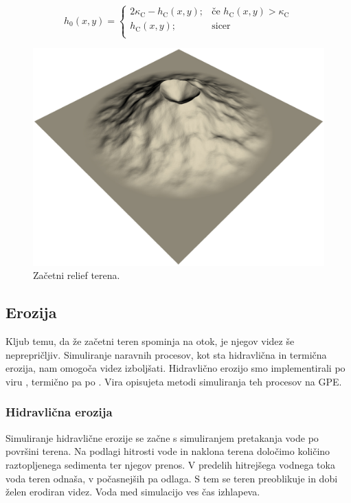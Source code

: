\documentclass[9pt]{pnas-new}
\newcommand{\const}[1]{{\ensuremath{\kappa_\mathrm{#1}}}}
\begin{document}
\begin{equation} \label{eq:crater}
h_0(x,y) = 
\begin{cases}
2\const{C} - h_\mathrm{C}(x,y); & \text{če } h_\mathrm{C}(x,y) > \const{C}\\
h_\mathrm{C}(x,y); & \text{sicer}\\
\end{cases}
\end{equation}

\begin{figure}
	\centering
	\includegraphics[width=.8\linewidth]{example_merged_crater_screen}
	\caption{Začetni relief terena.}
	\label{fig:merged_crater_example}
\end{figure}

\subsection*{Erozija}
Kljub temu, da že začetni teren spominja na otok, je njegov videz še neprepričljiv. Simuliranje naravnih procesov, kot sta hidravlična in termična erozija, nam omogoča videz izboljšati. Hidravlično erozijo smo implementirali po viru \cite{benevs_fast_gpu_07}, termično pa po \cite{jako_fast_gpu_11}. Vira opisujeta metodi simuliranja teh procesov na GPE.

\subsubsection*{Hidravlična erozija}
Simuliranje hidravlične erozije se začne s simuliranjem pretakanja vode po površini terena. Na podlagi hitrosti vode in naklona terena določimo količino raztopljenega sedimenta ter njegov prenos. V predelih hitrejšega vodnega toka voda teren odnaša, v počasnejših pa odlaga. S tem se teren preoblikuje in dobi želen erodiran videz. Voda med simulacijo ves čas izhlapeva.
\end{document}
